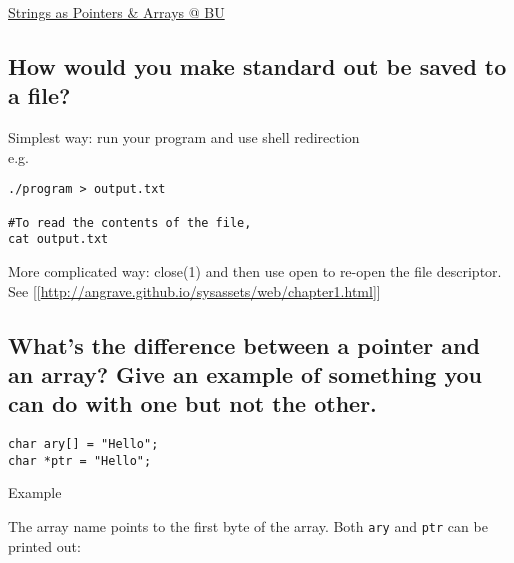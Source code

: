 \href{https://www.cs.bu.edu/teaching/c/string/intro/}{Strings as
Pointers \& Arrays @ BU}

\subsection{How would you make standard out be saved to a
file?}\label{how-would-you-make-standard-out-be-saved-to-a-file}

Simplest way: run your program and use shell redirection\\e.g.

\begin{verbatim}
./program > output.txt

#To read the contents of the file,
cat output.txt
\end{verbatim}

More complicated way: close(1) and then use open to re-open the file
descriptor.\\See
{[}{[}\url{http://angrave.github.io/sysassets/web/chapter1.html}{]}{]}

\subsection{What's the difference between a pointer and an array? Give
an example of something you can do with one but not the
other.}\label{whats-the-difference-between-a-pointer-and-an-array-give-an-example-of-something-you-can-do-with-one-but-not-the-other.}

\begin{verbatim}
char ary[] = "Hello";
char *ptr = "Hello";
\end{verbatim}

Example

The array name points to the first byte of the array. Both \texttt{ary}
and \texttt{ptr} can be printed out:

\begin{Shaded}
\end{Shaded}

